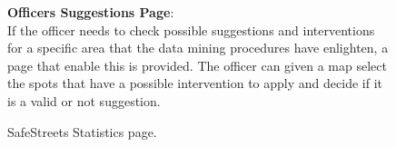\begin{figure}
	\begin{flushleft}
		\textbf{Officers Suggestions Page}:\\
		If the officer needs to check possible suggestions and interventions for a specific area that the data mining procedures have enlighten, a page that enable this is provided. The officer can given a map select the spots that have a possible intervention to apply and decide if it is a valid or not suggestion.
	\end{flushleft}
	\centering
	\caption{SafeStreets Statistics page.}
	\label{fig:suggestions}
\end{figure}
\clearpage
